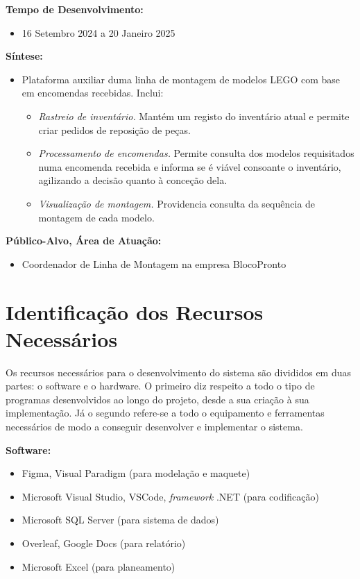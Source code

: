         \textbf{Tempo de Desenvolvimento:}
        \begin{itemize}
            \item[] 16 Setembro 2024 a 20 Janeiro 2025
        \end{itemize}

        \textbf{Síntese:}
        \begin{itemize}
            \item [] Plataforma auxiliar duma linha de montagem de modelos LEGO com base em encomendas recebidas. Inclui:
            \begin{itemize}
                \item \textit{Rastreio de inventário.}
                    Mantém um registo do inventário atual e permite criar pedidos de reposição de peças.
                \item \textit{Processamento de encomendas.}
                    Permite consulta dos modelos requisitados numa encomenda recebida e informa se é viável consoante o inventário, agilizando a decisão quanto à conceção dela.
                \item \textit{Visualização de montagem.}
                    Providencia consulta da sequência de montagem de cada modelo.
            \end{itemize}
        \end{itemize}
        \textbf{Público-Alvo, Área de Atuação:}
        \begin{itemize}
            \item[] Coordenador de Linha de Montagem na empresa BlocoPronto
        \end{itemize}

    \newpage
    \section{Identificação dos Recursos Necessários}
    
    Os recursos necessários para o desenvolvimento do sistema são divididos em duas partes: o software e o hardware. O primeiro diz respeito a todo o tipo de programas desenvolvidos ao longo do projeto, desde a sua criação à sua implementação. Já o segundo refere-se a todo o equipamento e ferramentas necessários de modo a conseguir desenvolver e implementar o sistema.

        \textbf{Software:}
        \begin{itemize}
            \item Figma, Visual Paradigm (para modelação e maquete)
            \item Microsoft Visual Studio, VSCode, \textit{framework} .NET (para codificação)
            \item Microsoft SQL Server (para sistema de dados)
            \item Overleaf, Google Docs (para relatório)
            \item Microsoft Excel (para planeamento)
        \end{itemize}

